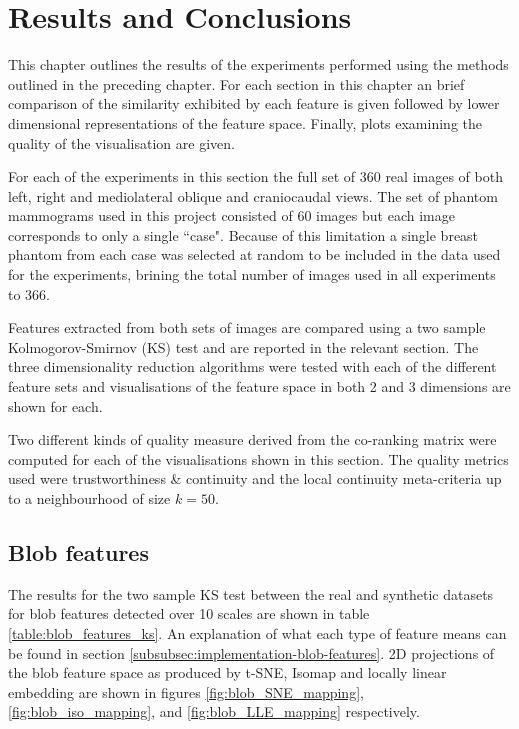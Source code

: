 \chapter{Results and Conclusions}
\label{chap:results}

This chapter outlines the results of the experiments performed using the methods outlined in the preceding chapter. For each section in this chapter an brief comparison of the similarity exhibited by each feature is given followed by lower dimensional representations of the feature space. Finally, plots examining the quality of the visualisation are given.

For each of the experiments in this section the full set of 360 real images of both left, right and mediolateral oblique and craniocaudal views. The set of phantom mammograms used in this project consisted of 60 images but each image corresponds to only a single ``case". Because of this limitation a single breast phantom from each case was selected at random to be included in the data used for the experiments, brining the total number of images used in all experiments to 366.

Features extracted from both sets of images are compared using a two sample Kolmogorov-Smirnov (KS) test and are reported in the relevant section. The three dimensionality reduction algorithms were tested with each of the different feature sets and visualisations of the feature space in both 2 and 3 dimensions are shown for each.

Two different kinds of quality measure derived from the co-ranking matrix were computed for each of the visualisations shown in this section. The quality metrics used were trustworthiness \& continuity and the local continuity meta-criteria up to a neighbourhood of size $k=50$.

\section{Blob features} 
The results for the two sample KS test between the real and synthetic datasets for blob features detected over 10 scales are shown in table \ref{table:blob_features_ks}. An explanation of what each type of feature means can be found in section \ref{subsubsec:implementation-blob-features}. 2D projections of the blob feature space as produced by t-SNE, Isomap and locally linear embedding are shown in figures \ref{fig:blob_SNE_mapping}, \ref{fig:blob_iso_mapping}, and \ref{fig:blob_LLE_mapping} respectively. 

